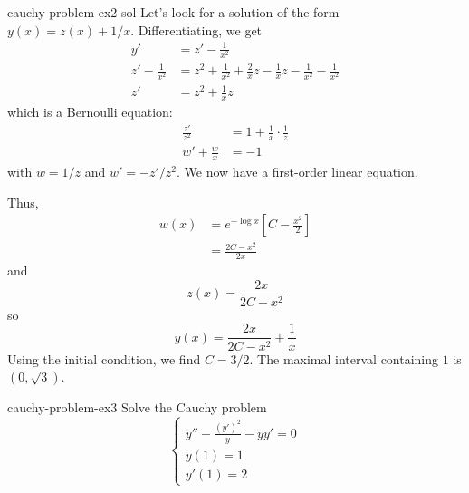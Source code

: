 \documentclass[preview]{standalone}
\begin{document}
\begin{snippetsolution}{cauchy-problem-ex2-sol}{}
    Let's look for a solution of the form \(y(x) = z(x) + 1/x\).
    Differentiating, we get
    \begin{align*}
        y' &= z' - \frac{1}{x^2} \\
        z' - \frac{1}{x^2} &= z^2 + \frac{1}{x^2} + \frac{2}{x}z - \frac{1}{x}z - \frac{1}{x^2} - \frac{1}{x^2} \\
        z' &= z^2 + \frac{1}{x}z
    \end{align*}
    which is a Bernoulli equation:
    \begin{align*}
        \frac{z'}{z^2} &= 1 + \frac{1}{x} \cdot \frac{1}{z} \\
        w' + \frac{w}{x} &= -1
    \end{align*}
    with \(w = 1/z\) and \(w' = -z'/z^2\).
    We now have a first-order linear equation.

    Thus,
    \begin{align*}
        w(x) &= e^{-\log x} \left[
            C - \frac{x^2}{2}
        \right] \\
        &= \frac{2C - x^2}{2x}
    \end{align*}
    and
    \[
        z(x) = \frac{2x}{2C - x^2}
    \]
    so
    \[
        y(x) = \frac{2x}{2C - x^2} + \frac{1}{x}
    \]
    Using the initial condition, we find \(C = 3/2\).
    The maximal interval containing \(1\) is \((0,\sqrt3)\).
\end{snippetsolution}

\begin{snippetexercise}{cauchy-problem-ex3}{}
    Solve the Cauchy problem
    \[
        \begin{cases}
            y'' - \frac{{(y')}^2}{y} - yy' = 0 \\
            y(1) = 1 \\
            y'(1) = 2
        \end{cases}
    \]
\end{snippetexercise}
\end{document}
